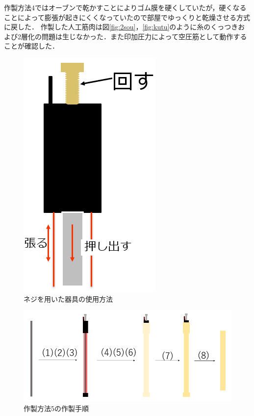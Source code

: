 作製方法4ではオーブンで乾かすことによりゴム膜を硬くしていたが，硬くなることによって膨張が起きにくくなっていたので部屋でゆっくりと乾燥させる方式に戻した．
作製した人工筋肉は図\ref{fig:2sou}，\ref{fig:kutu}のように糸のくっつきおよび2層化の問題は生じなかった．また印加圧力によって空圧筋として動作することが確認した．
\begin{figure}[htbp]
  \centering  %
  \includegraphics[scale=0.4]{pic/mawa.PNG}
  \caption{ネジを用いた器具の使用方法}
  \label{fig:mawa}
\end{figure}
\begin{figure}[htbp]
  \centering  %
  \includegraphics[scale=0.4]{pic/ten.PNG}
  \caption{作製方法5の作製手順}
  \label{fig:ten}
\end{figure}
